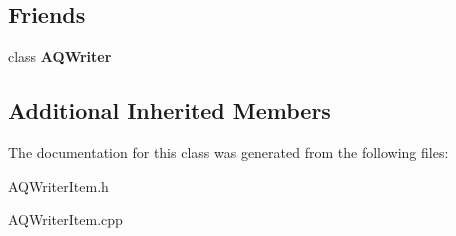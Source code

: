\subsection*{Friends}
\begin{DoxyCompactItemize}
\item 
class {\bfseries A\+Q\+Writer}\hypertarget{class_a_q_writer_item_af06d9ff3c550f5e56ca5f6ca0c12db6c}{}\label{class_a_q_writer_item_af06d9ff3c550f5e56ca5f6ca0c12db6c}

\end{DoxyCompactItemize}
\subsection*{Additional Inherited Members}


The documentation for this class was generated from the following files\+:\begin{DoxyCompactItemize}
\item 
A\+Q\+Writer\+Item.\+h\item 
A\+Q\+Writer\+Item.\+cpp\end{DoxyCompactItemize}
